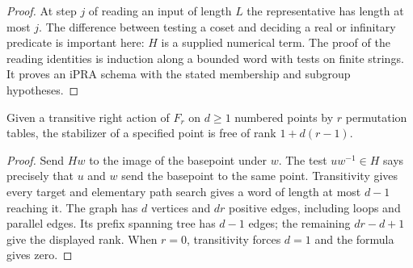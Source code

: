 \begin{proof}
At step $j$ of reading an input of length $L$ the representative has length at most $j$. The difference between testing a coset and deciding a real or infinitary predicate is important here: $H$ is a supplied numerical term. The proof of the reading identities is induction along a bounded word with tests on finite strings. It proves an iPRA schema with the stated membership and subgroup hypotheses.
\end{proof}

\begin{corollary}\label{idx-schreier22}
Given a transitive right action of $F_r$ on $d\ge1$ numbered points by $r$ permutation tables, the stabilizer of a specified point is free of rank $1+d(r-1)$.
\end{corollary}
\begin{proof}
Send $Hw$ to the image of the basepoint under $w$. The test $uw^{-1}\in H$ says precisely that $u$ and $w$ send the basepoint to the same point. Transitivity gives every target and elementary path search gives a word of length at most $d-1$ reaching it. The graph has $d$ vertices and $dr$ positive edges, including loops and parallel edges. Its prefix spanning tree has $d-1$ edges; the remaining $dr-d+1$ give the displayed rank. When $r=0$, transitivity forces $d=1$ and the formula gives zero.
\end{proof}

